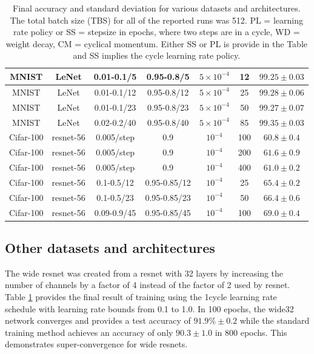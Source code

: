 \documentclass{article}
\begin{document}
\begin{table}[tb]
\begin{center}
\begin{tabular}{| c | c | c | c | c | c | c | }
			MNIST  & LeNet & 0.01-0.1/5  & 0.95-0.8/5 & $5 \times 10^{-4}$  &  12 & $ 99.25  \pm 0.03 $   \\ \hline
			MNIST  & LeNet & 0.01-0.1/12  & 0.95-0.8/12 & $5 \times 10^{-4}$  &  25 & $ 99.28  \pm 0.06 $   \\ \hline
			MNIST  & LeNet & 0.01-0.1/23  & 0.95-0.8/23 & $5 \times 10^{-4}$  &  50 & $ 99.27  \pm 0.07 $   \\ \hline
			MNIST  & LeNet & 0.02-0.2/40  & 0.95-0.8/40 & $5 \times 10^{-4}$  &  85 & $ 99.35  \pm 0.03 $   \\ \hline
			\hline   
			Cifar-100 & resnet-56 & 0.005/step & 0.9  & $10^{-4}$  &  100 & $ 60.8 \pm 0.4 $   \\ \hline
			Cifar-100 & resnet-56 & 0.005/step & 0.9  & $10^{-4}$  &  200 & $ 61.6 \pm 0.9 $   \\ \hline
			Cifar-100 & resnet-56 & 0.005/step & 0.9  & $10^{-4}$  &  400 & $ 61.0 \pm 0.2 $   \\ \hline
			Cifar-100 & resnet-56 & 0.1-0.5/12 & 0.95-0.85/12 & $10^{-4}$  &  25 & $ 65.4 \pm 0.2 $   \\ \hline
			Cifar-100 & resnet-56 & 0.1-0.5/23 & 0.95-0.85/23 & $10^{-4}$  &  50 & $ 66.4 \pm 0.6 $   \\ \hline
			Cifar-100 & resnet-56 & 0.09-0.9/45 & 0.95-0.85/45 & $10^{-4}$  &  100 & $ 69.0 \pm 0.4 $   \\ \hline
		\end{tabular}
		\vspace{10pt}
		\caption{Final accuracy and standard deviation for various datasets and architectures.  The total batch size (TBS) for all of the reported runs was 512.  PL = learning rate policy or SS = stepsize in epochs, where two steps are in a cycle, WD = weight decay, CM = cyclical momentum. Either SS or PL is provide in the Table and SS implies the cycle learning rate policy. }
		\label{tab:otherExamples}
	\end{center}
	\vspace{-20pt}
\end{table}

\subsection{Other datasets and architectures}
\label{other}

The wide resnet was created from a resnet with 32 layers by increasing the number of channels by a factor of 4 instead of the factor of 2 used by resnet.   Table \ref{tab:otherExamples} provides the final result of training using the 1cycle learning rate schedule with learning rate bounds from 0.1 to 1.0.  In 100 epochs, the wide32 network converges and provides a test accuracy of $91.9\% \pm 0.2$ while the standard training method achieves an accuracy of only $ 90.3 \pm 1.0 $ in 800 epochs.  This demonstrates super-convergence for wide resnets.
\end{document}
